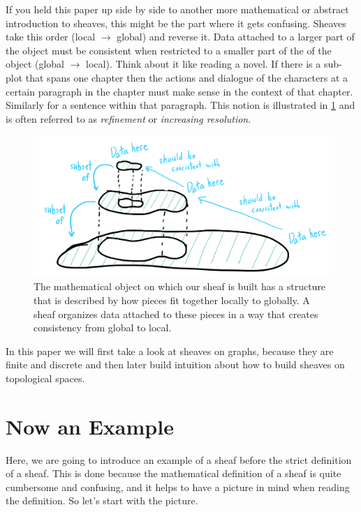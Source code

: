 \documentclass{tufte-handout}
\begin{document}
If you held this paper up side by side to another more mathematical or abstract introduction to sheaves, this might be the part where it gets confusing. Sheaves take this order (local $\rightarrow$ global) and reverse it. Data attached to a larger part of the object must be consistent when restricted to a smaller part of the of the object (global $\rightarrow$ local). Think about it like reading a novel. If there is a sub-plot that spans one chapter then the actions and dialogue of the characters at a certain paragraph in the chapter must make sense in the context of that chapter. Similarly for a sentence within that paragraph. This notion is illustrated in \cref{fig:refine} and is often referred to as \emph{refinement} or \emph{increasing resolution}. 

\begin{figure}[h!]
    \centering
    \includegraphics{refine.png}
    \caption{The mathematical object on which our sheaf is built has a structure that is described by how pieces fit together locally to globally. A sheaf organizes data attached to these pieces in a way that creates consistency from global to local.}
    \label{fig:refine}
\end{figure}

In this paper we will first take a look at sheaves on graphs, because they are finite and discrete and then later build intuition about how to build sheaves on topological spaces.


\section{Now an Example}
Here, we are going to introduce an example of a sheaf before the strict definition of a sheaf. This is done because the mathematical definition of a sheaf is quite cumbersome and confusing, and it helps to have a picture in mind when reading the definition. So let's start with the picture.
\end{document}
